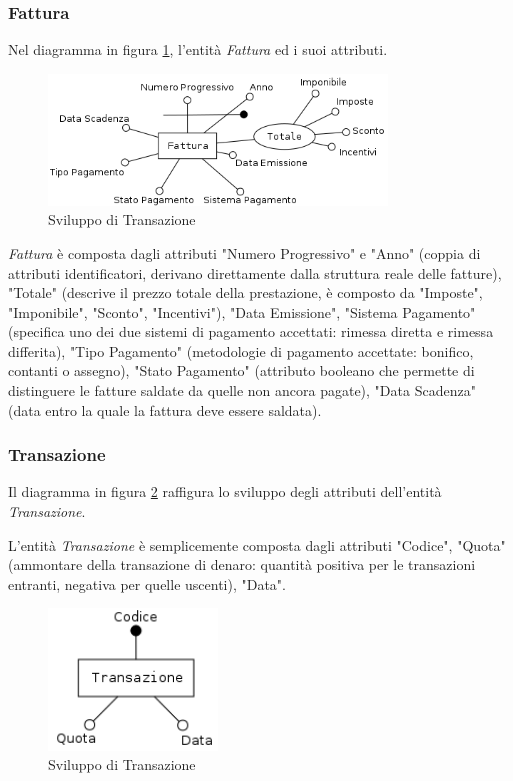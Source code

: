 		\subsubsection{Fattura}
		
			Nel diagramma in figura \ref{fig:fattura}, l'entità \emph{Fattura} ed i suoi attributi.
		
			\begin{figure}[H]
				\centering
				\includegraphics[width=9cm]{images/finitures/fattura.png}
				\caption{Sviluppo di Transazione}
				\label{fig:fattura}
			\end{figure}
			
			\emph{Fattura} è composta dagli attributi "Numero Progressivo" e "Anno" (coppia di attributi identificatori, derivano direttamente dalla struttura reale delle fatture), "Totale" (descrive il prezzo totale della prestazione, è composto da "Imposte", "Imponibile", "Sconto", "Incentivi"), "Data Emissione", "Sistema Pagamento" (specifica uno dei due sistemi di pagamento accettati: rimessa diretta e rimessa differita), "Tipo Pagamento" (metodologie di pagamento accettate: bonifico, contanti o assegno), "Stato Pagamento" (attributo booleano che permette di distinguere le fatture saldate da quelle non ancora pagate), "Data Scadenza" (data entro la quale la fattura deve essere saldata).
		
		\subsubsection{Transazione}
			
			Il diagramma in figura \ref{fig:transazione} raffigura lo sviluppo degli attributi dell'entità \emph{Transazione}.
			
			L'entità \emph{Transazione} è semplicemente composta dagli attributi "Codice", "Quota" (ammontare della transazione di denaro: quantità positiva per le transazioni entranti, negativa per quelle uscenti), "Data".
						
			\begin{figure}[H]
				\centering
				\includegraphics[width=4.5cm]{images/finitures/transazione.png}
				\caption{Sviluppo di Transazione}
				\label{fig:transazione}
			\end{figure}
		

